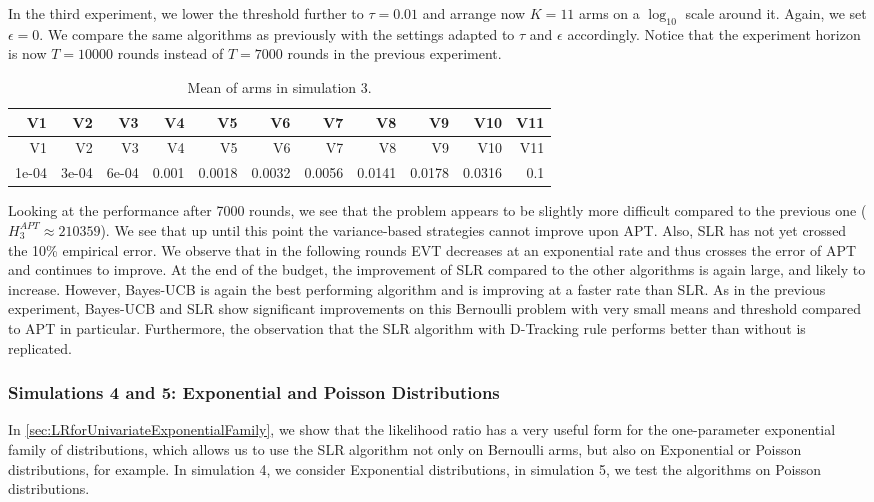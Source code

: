 \documentclass[11pt,]{article}
\begin{document}
In the third experiment, we lower the threshold further to
\(\tau = 0.01\) and arrange now \(K=11\) arms on a \(\log_{10}\) scale
around it. Again, we set \(\epsilon = 0\). We compare the same
algorithms as previously with the settings adapted to \(\tau\) and
\(\epsilon\) accordingly. Notice that the experiment horizon is now
\(T=10000\) rounds instead of \(T=7000\) rounds in the previous
experiment.

\begin{longtable}[]{@{}rrrrrrrrrrr@{}}
\caption{Mean of arms in simulation 3.}\tabularnewline
\toprule
V1 & V2 & V3 & V4 & V5 & V6 & V7 & V8 & V9 & V10 & V11\tabularnewline
\midrule
\endfirsthead
\toprule
V1 & V2 & V3 & V4 & V5 & V6 & V7 & V8 & V9 & V10 & V11\tabularnewline
\midrule
\endhead
1e-04 & 3e-04 & 6e-04 & 0.001 & 0.0018 & 0.0032 & 0.0056 & 0.0141 &
0.0178 & 0.0316 & 0.1\tabularnewline
\bottomrule
\end{longtable}

Looking at the performance after 7000 rounds, we see that the problem
appears to be slightly more difficult compared to the previous one
(\(H_3^{APT} \approx 210359\)). We see that up until this point the
variance-based strategies cannot improve upon APT. Also, SLR has not yet
crossed the 10\% empirical error. We observe that in the following
rounds EVT decreases at an exponential rate and thus crosses the error
of APT and continues to improve. At the end of the budget, the
improvement of SLR compared to the other algorithms is again large, and
likely to increase. However, Bayes-UCB is again the best performing
algorithm and is improving at a faster rate than SLR. As in the previous
experiment, Bayes-UCB and SLR show significant improvements on this
Bernoulli problem with very small means and threshold compared to APT in
particular. Furthermore, the observation that the SLR algorithm with
D-Tracking rule performs better than without is replicated.

\newpage

\subsubsection{Simulations 4 and 5: Exponential and Poisson
Distributions}\label{simulations-4-and-5-exponential-and-poisson-distributions}

In \autoref{sec:LRforUnivariateExponentialFamily}, we show that the
likelihood ratio has a very useful form for the one-parameter
exponential family of distributions, which allows us to use the SLR
algorithm not only on Bernoulli arms, but also on Exponential or Poisson
distributions, for example. In simulation 4, we consider Exponential
distributions, in simulation 5, we test the algorithms on Poisson
distributions.
\end{document}
